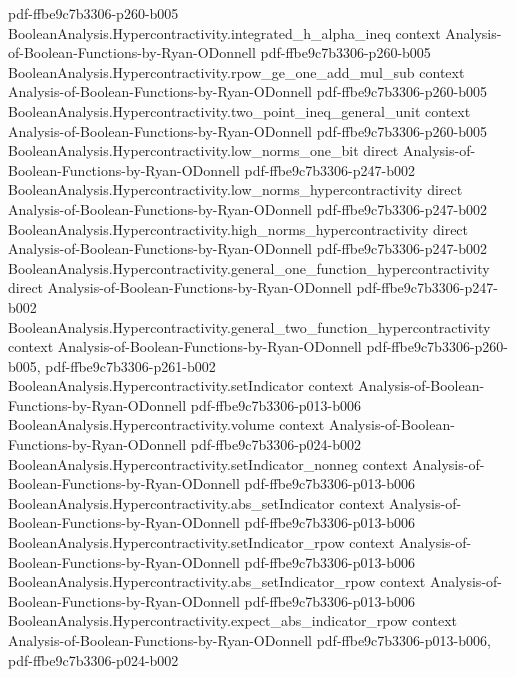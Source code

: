 \begin{theorem}
  {pdf-ffbe9c7b3306-p260-b005}
\proofstep
  {BooleanAnalysis.Hypercontractivity.integrated_h_alpha_ineq}
  {context}
  {Analysis-of-Boolean-Functions-by-Ryan-ODonnell}
  {pdf-ffbe9c7b3306-p260-b005}
\proofstep
  {BooleanAnalysis.Hypercontractivity.rpow_ge_one_add_mul_sub}
  {context}
  {Analysis-of-Boolean-Functions-by-Ryan-ODonnell}
  {pdf-ffbe9c7b3306-p260-b005}
\proofstep
  {BooleanAnalysis.Hypercontractivity.two_point_ineq_general_unit}
  {context}
  {Analysis-of-Boolean-Functions-by-Ryan-ODonnell}
  {pdf-ffbe9c7b3306-p260-b005}
\proofstep
  {BooleanAnalysis.Hypercontractivity.low_norms_one_bit}
  {direct}
  {Analysis-of-Boolean-Functions-by-Ryan-ODonnell}
  {pdf-ffbe9c7b3306-p247-b002}
\proofstep
  {BooleanAnalysis.Hypercontractivity.low_norms_hypercontractivity}
  {direct}
  {Analysis-of-Boolean-Functions-by-Ryan-ODonnell}
  {pdf-ffbe9c7b3306-p247-b002}
\proofstep
  {BooleanAnalysis.Hypercontractivity.high_norms_hypercontractivity}
  {direct}
  {Analysis-of-Boolean-Functions-by-Ryan-ODonnell}
  {pdf-ffbe9c7b3306-p247-b002}
\proofstep
  {BooleanAnalysis.Hypercontractivity.general_one_function_hypercontractivity}
  {direct}
  {Analysis-of-Boolean-Functions-by-Ryan-ODonnell}
  {pdf-ffbe9c7b3306-p247-b002}
\proofstep
  {BooleanAnalysis.Hypercontractivity.general_two_function_hypercontractivity}
  {context}
  {Analysis-of-Boolean-Functions-by-Ryan-ODonnell}
  {pdf-ffbe9c7b3306-p260-b005,
    pdf-ffbe9c7b3306-p261-b002}
\proofstep
  {BooleanAnalysis.Hypercontractivity.setIndicator}
  {context}
  {Analysis-of-Boolean-Functions-by-Ryan-ODonnell}
  {pdf-ffbe9c7b3306-p013-b006}
\proofstep
  {BooleanAnalysis.Hypercontractivity.volume}
  {context}
  {Analysis-of-Boolean-Functions-by-Ryan-ODonnell}
  {pdf-ffbe9c7b3306-p024-b002}
\proofstep
  {BooleanAnalysis.Hypercontractivity.setIndicator_nonneg}
  {context}
  {Analysis-of-Boolean-Functions-by-Ryan-ODonnell}
  {pdf-ffbe9c7b3306-p013-b006}
\proofstep
  {BooleanAnalysis.Hypercontractivity.abs_setIndicator}
  {context}
  {Analysis-of-Boolean-Functions-by-Ryan-ODonnell}
  {pdf-ffbe9c7b3306-p013-b006}
\proofstep
  {BooleanAnalysis.Hypercontractivity.setIndicator_rpow}
  {context}
  {Analysis-of-Boolean-Functions-by-Ryan-ODonnell}
  {pdf-ffbe9c7b3306-p013-b006}
\proofstep
  {BooleanAnalysis.Hypercontractivity.abs_setIndicator_rpow}
  {context}
  {Analysis-of-Boolean-Functions-by-Ryan-ODonnell}
  {pdf-ffbe9c7b3306-p013-b006}
\proofstep
  {BooleanAnalysis.Hypercontractivity.expect_abs_indicator_rpow}
  {context}
  {Analysis-of-Boolean-Functions-by-Ryan-ODonnell}
  {pdf-ffbe9c7b3306-p013-b006,
    pdf-ffbe9c7b3306-p024-b002}

\end{theorem}
